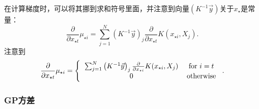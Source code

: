 \documentclass[index]{subfiles}
\begin{document}
在计算梯度时，可以将其挪到求和符号里面，并注意到向量$(K^{-1}\vec{y})$关于$x_{\star}$是常量：
\begin{equation}
 \frac{\partial}{\partial x_{\star t}} \mu_{\star i} = \sum_{j = 1}^{N} \left(K^{-1} \vec{y} \right)_{j} \frac{\partial}{\partial x_{\star t}} K(x_{\star i}, X_{j}).
\end{equation}
注意到
\begin{equation}
\frac{\partial}{\partial x_{\star t}} \mu_{\star i} = \left\{ \begin{tabular}{cc}
                                                                  $\sum_{j = 1}^{N} \left(K^{-1} \vec{y} \right)_{j} \frac{\partial}{\partial x_{\star i}} K(x_{\star i}, X_{j})$ & for $i = t$ \\
								  0 & otherwise
                                                                 \end{tabular}\right..
\end{equation}

\subsubsection{GP方差}
\label{methods_GP_var}
\end{document}
